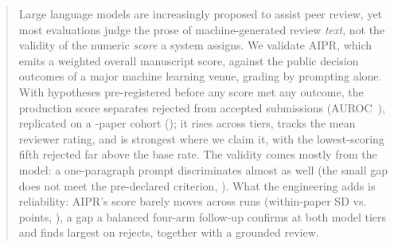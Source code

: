 \begin{abstract}
\noindent
Large language models are increasingly proposed to assist peer review, yet most evaluations
judge the prose of machine-generated review \emph{text}, not the validity of the numeric
\emph{score} a system assigns. We validate \textsc{AIPR}, which emits a weighted overall
manuscript score, against the public decision outcomes of a major machine learning venue,
grading by prompting alone. With hypotheses pre-registered before any score met any outcome, the
production score separates rejected from accepted submissions (AUROC~\aurocFull), replicated on a
\NminiPrimary-paper cohort (\aurocMini); it rises across tiers, tracks the mean reviewer rating,
and is strongest where we claim it, with the lowest-scoring fifth rejected far above the base
rate. The validity comes mostly from the model: a one-paragraph prompt discriminates almost as
well (the small gap does not meet the pre-declared criterion, \aurocDiffPrel). What the
engineering adds is reliability: AIPR's score barely moves across runs (within-paper SD
\fullRunSD{} vs.\ \naiveRunSD{} points, \relPairedP{}), a gap a balanced four-arm follow-up
confirms at both model tiers and finds largest on rejects, together with a grounded review.
\end{abstract}
